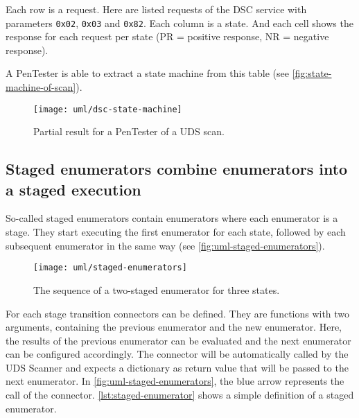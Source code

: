 Each row is a request. Here are listed requests of the DSC service with parameters \texttt{0x02}, \texttt{0x03} and \texttt{0x82}. Each column is a state. And each cell shows the response for each request per state (PR = positive response, NR = negative response).

A PenTester is able to extract a state machine from this table (see \autoref{fig:state-machine-of-scan}).

\begin{figure}[H]
    \centering
    \texttt{[image: uml/dsc-state-machine]}
    \caption{Partial result for a PenTester of a UDS scan.}
    \label{fig:state-machine-of-scan}
\end{figure}

\subsection{Staged enumerators combine enumerators into a staged execution}

So-called staged enumerators contain enumerators where each enumerator is a stage. They start executing the first enumerator for each state, followed by each subsequent enumerator in the same way (see \autoref{fig:uml-staged-enumerators}).


\begin{figure}[htb]
    \centering
    \texttt{[image: uml/staged-enumerators]}
    \caption{The sequence of a two-staged enumerator for three states.}
    \label{fig:uml-staged-enumerators}
\end{figure}

For each stage transition connectors can be defined. They are functions with two arguments, containing the previous enumerator and the new enumerator. Here, the results of the previous enumerator can be evaluated and the next enumerator can be configured accordingly. The connector will be automatically called by the UDS Scanner and expects a dictionary as return value that will be passed to the next enumerator. In \autoref{fig:uml-staged-enumerators}, the blue arrow represents the call of the connector. \autoref{lst:staged-enumerator} shows a simple definition of a staged enumerator.

